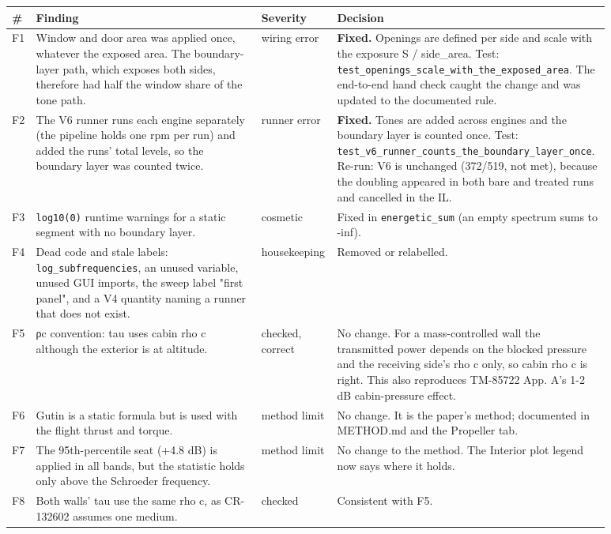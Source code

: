 \documentclass[10pt,a4paper]{article}
\begin{document}
{\small
\begin{longtable}{>{\raggedright\arraybackslash}p{0.032\linewidth}>{\raggedright\arraybackslash}p{0.371\linewidth}>{\raggedright\arraybackslash}p{0.106\linewidth}>{\raggedright\arraybackslash}p{0.371\linewidth}}
\hline
\textbf{\#} & \textbf{Finding} & \textbf{Severity} & \textbf{Decision} \\
\hline
\endhead
F1 & Window and door area was applied once, whatever the exposed area. The boundary-layer path, which exposes both sides, therefore had half the window share of the tone path. & wiring error & \textbf{Fixed.} Openings are defined per side and scale with the exposure S / side\_area. Test: \texttt{test\_\allowbreak{}openings\_\allowbreak{}scale\_\allowbreak{}with\_\allowbreak{}the\_\allowbreak{}exposed\_\allowbreak{}area}. The end-to-end hand check caught the change and was updated to the documented rule. \\
F2 & The V6 runner runs each engine separately (the pipeline holds one rpm per run) and added the runs' total levels, so the boundary layer was counted twice. & runner error & \textbf{Fixed.} Tones are added across engines and the boundary layer is counted once. Test: \texttt{test\_\allowbreak{}v6\_\allowbreak{}runner\_\allowbreak{}counts\_\allowbreak{}the\_\allowbreak{}boundary\_\allowbreak{}layer\_\allowbreak{}once}. Re-run: V6 is unchanged (372/519, not met), because the doubling appeared in both bare and treated runs and cancelled in the IL. \\
F3 & \texttt{log10(0)} runtime warnings for a static segment with no boundary layer. & cosmetic & Fixed in \texttt{energetic\_\allowbreak{}sum} (an empty spectrum sums to -inf). \\
F4 & Dead code and stale labels: \texttt{log\_\allowbreak{}subfrequencies}, an unused variable, unused GUI imports, the sweep label "first panel", and a V4 quantity naming a runner that does not exist. & housekeeping & Removed or relabelled. \\
F5 & ρc convention: tau uses cabin rho c although the exterior is at altitude. & checked, correct & No change. For a mass-controlled wall the transmitted power depends on the blocked pressure and the receiving side's rho c only, so cabin rho c is right. This also reproduces TM-85722 App. A's 1-2 dB cabin-pressure effect. \\
F6 & Gutin is a static formula but is used with the flight thrust and torque. & method limit & No change. It is the paper's method; documented in METHOD.md and the Propeller tab. \\
F7 & The 95th-percentile seat (+4.8 dB) is applied in all bands, but the statistic holds only above the Schroeder frequency. & method limit & No change to the method. The Interior plot legend now says where it holds. \\
F8 & Both walls' tau use the same rho c, as CR-132602 assumes one medium. & checked & Consistent with F5. \\
\hline
\end{longtable}}
\end{document}
